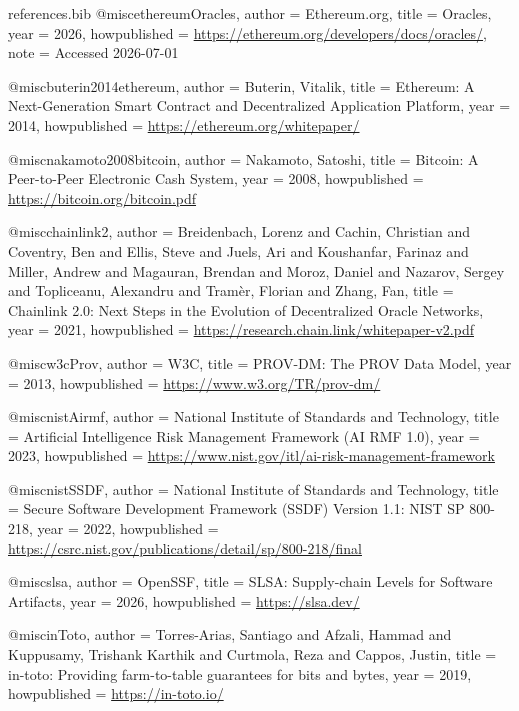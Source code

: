 \begin{filecontents*}{references.bib}
@misc{ethereumOracles,
  author       = {{Ethereum.org}},
  title        = {{Oracles}},
  year         = {2026},
  howpublished = {\url{https://ethereum.org/developers/docs/oracles/}},
  note         = {Accessed 2026-07-01}
}

@misc{buterin2014ethereum,
  author       = {Buterin, Vitalik},
  title        = {{Ethereum: A Next-Generation Smart Contract and Decentralized Application Platform}},
  year         = {2014},
  howpublished = {\url{https://ethereum.org/whitepaper/}}
}

@misc{nakamoto2008bitcoin,
  author       = {Nakamoto, Satoshi},
  title        = {{Bitcoin: A Peer-to-Peer Electronic Cash System}},
  year         = {2008},
  howpublished = {\url{https://bitcoin.org/bitcoin.pdf}}
}

@misc{chainlink2,
  author       = {Breidenbach, Lorenz and Cachin, Christian and Coventry, Ben and Ellis, Steve and Juels, Ari and Koushanfar, Farinaz and Miller, Andrew and Magauran, Brendan and Moroz, Daniel and Nazarov, Sergey and Topliceanu, Alexandru and Tramèr, Florian and Zhang, Fan},
  title        = {{Chainlink 2.0: Next Steps in the Evolution of Decentralized Oracle Networks}},
  year         = {2021},
  howpublished = {\url{https://research.chain.link/whitepaper-v2.pdf}}
}

@misc{w3cProv,
  author       = {{W3C}},
  title        = {{PROV-DM: The PROV Data Model}},
  year         = {2013},
  howpublished = {\url{https://www.w3.org/TR/prov-dm/}}
}

@misc{nistAirmf,
  author       = {{National Institute of Standards and Technology}},
  title        = {{Artificial Intelligence Risk Management Framework (AI RMF 1.0)}},
  year         = {2023},
  howpublished = {\url{https://www.nist.gov/itl/ai-risk-management-framework}}
}

@misc{nistSSDF,
  author       = {{National Institute of Standards and Technology}},
  title        = {{Secure Software Development Framework (SSDF) Version 1.1: NIST SP 800-218}},
  year         = {2022},
  howpublished = {\url{https://csrc.nist.gov/publications/detail/sp/800-218/final}}
}

@misc{slsa,
  author       = {{OpenSSF}},
  title        = {{SLSA: Supply-chain Levels for Software Artifacts}},
  year         = {2026},
  howpublished = {\url{https://slsa.dev/}}
}

@misc{inToto,
  author       = {Torres-Arias, Santiago and Afzali, Hammad and Kuppusamy, Trishank Karthik and Curtmola, Reza and Cappos, Justin},
  title        = {{in-toto: Providing farm-to-table guarantees for bits and bytes}},
  year         = {2019},
  howpublished = {\url{https://in-toto.io/}}
}


\end{filecontents*}
